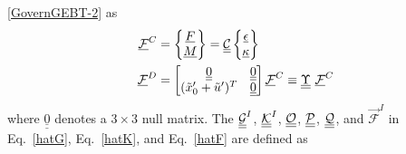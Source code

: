 \eqref{GovernGEBT-2} as
\begin{align}
	\label{FC}
	\mathcal{\underline{F}}^C &= \begin{Bmatrix}
         \underline{F} \\
	\underline{M}
	\end{Bmatrix} = \underline{\underline{\mathcal{C}}} \begin{Bmatrix}
	\underline{\epsilon} \\
	\underline{\kappa}
	\end{Bmatrix} \\
	\label{FD}
	\mathcal{\underline{F}}^D & = \begin{bmatrix}
	\underline{\underline{0}} & \underline{\underline{0}}\\
	(\tilde{x}_0^\prime+\tilde{u}^\prime)^T & \underline{\underline{0}}
	\end{bmatrix}
	\mathcal{\underline{F}}^C \equiv \underline{\underline{\Upsilon}}~ \mathcal{\underline{F}}^C
\end{align}
where $\underline{\underline{0}}$ denotes a $3 \times 3$ null matrix. The $\underline{\underline{\mathcal{G}}}^I$, $\underline{\underline{\mathcal{K}}}^I$,  $\mathcal{\underline{\underline{O}}}$, $\mathcal{\underline{\underline{P}}}$, $\mathcal{\underline{\underline{Q}}}$, and $\vec{\mathcal{F}}^I$ in Eq.~\eqref{hatG}, Eq.~\eqref{hatK}, and Eq.~\eqref{hatF} are defined as

